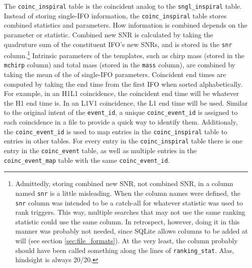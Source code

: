 The \texttt{coinc\_inspiral} table is the coincident analog to the \texttt{sngl\_inspiral} table. Instead of storing single-\ac{IFO} information, the \texttt{coinc\_inspiral} table stores combined statistics and parameters. How information is combined depends on the parameter or statistic. Combined new \ac{SNR} is calculated by taking the quadruture sum of the constituent \ac{IFO}'s new \acp{SNR}, and is stored in the \texttt{snr} column.\footnote{Admittedly, storing combined new \ac{SNR}, not combined \ac{SNR}, in a column named \texttt{snr} is a little misleading. When the column names were defined, the \texttt{snr} column was intended to be a catch-all for whatever statistic was used to rank triggers. This way, multiple searches that may not use the same ranking statistic could use the same column. In retrospect, however, doing it in this manner was probably not needed, since SQLite allows columns to be added at will (see section \ref{sec:file_formats}). At the very least, the column probably should have been called something along the lines of \texttt{ranking\_stat}. Alas, hindsight is always 20/20.} Intrinsic parameters of the templates, such as chirp mass (stored in the \texttt{mchirp} column) and total mass (stored in the \texttt{mass} column), are combined by taking the mean of the of single-\ac{IFO} parameters. Coincident end times are computed by taking the end time from the first \ac{IFO} when sorted alphabetically. For example, in an H1L1 coincidence, the coincident end time will be whatever the H1 end time is. In an L1V1 coincidence, the L1 end time will be used. Similar to the original intent of the \texttt{event\_id}, a unique \texttt{coinc\_event\_id} is assigned to each coincidence in a file to provide a quick way to identify them. Additionaly, the \texttt{coinc\_event\_id} is used to map entries in the \texttt{coinc\_inspiral} table to entries in other tables. For every entry in the \texttt{coinc\_inspiral} table there is one entry in the \texttt{coinc\_event} table, as well as multiple entries in the \texttt{coinc\_event\_map} table with the same \texttt{coinc\_event\_id}.

